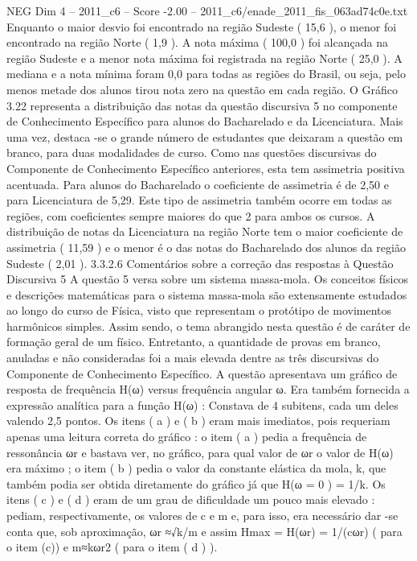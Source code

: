 \begin{textsample}{NEG Dim 4 – 2011\_c6 – Score -2.00 – 2011\_c6/enade\_2011\_fis\_063ad74c0e.txt}
Enquanto o maior desvio foi encontrado na região Sudeste ( 15,6 ), o menor foi encontrado na região Norte ( 1,9 ).
A nota máxima ( 100,0 ) foi alcançada na região Sudeste e a menor nota máxima foi registrada na região Norte ( 25,0 ).
A mediana e a nota mínima foram 0,0 para todas as regiões do Brasil, ou seja, pelo menos metade dos alunos tirou nota zero na questão em cada região.
O Gráfico 3.22 representa a distribuição das notas da questão discursiva 5 no componente de Conhecimento Específico para alunos do Bacharelado e da Licenciatura.
Mais uma vez, destaca -se o grande número de estudantes que deixaram a questão em branco, para duas modalidades de curso.
Como nas questões discursivas do Componente de Conhecimento Específico anteriores, esta tem assimetria positiva acentuada.
Para alunos do Bacharelado o coeficiente de assimetria é de 2,50 e para Licenciatura de 5,29.
Este tipo de assimetria também ocorre em todas as regiões, com coeficientes sempre maiores do que 2 para ambos os cursos.
A distribuição de notas da Licenciatura na região Norte tem o maior coeficiente de assimetria ( 11,59 ) e o menor é o das notas do Bacharelado dos alunos da região Sudeste ( 2,01 ). 3.3.2.6 Comentários sobre a correção das respostas à Questão Discursiva 5 A questão 5 versa sobre um sistema massa-mola.
Os conceitos físicos e descrições matemáticas para o sistema massa-mola são extensamente estudados ao longo do curso de Física, visto que representam o protótipo de movimentos harmônicos simples.
Assim sendo, o tema abrangido nesta questão é de caráter de formação geral de um físico.
Entretanto, a quantidade de provas em branco, anuladas e não consideradas foi a mais elevada dentre as três discursivas do Componente de Conhecimento Específico.
A questão apresentava um gráfico de resposta de frequência H(ω) versus frequência angular ω.
Era também fornecida a expressão analítica para a função H(ω) : Constava de 4 subitens, cada um deles valendo 2,5 pontos.
Os itens ( a ) e ( b ) eram mais imediatos, pois requeriam apenas uma leitura correta do gráfico : o item ( a ) pedia a frequência de ressonância ωr e bastava ver, no gráfico, para qual valor de ωr o valor de H(ω) era máximo ; o item ( b ) pedia o valor da constante elástica da mola, k, que também podia ser obtida diretamente do gráfico já que H(ω = 0 ) = 1/k.
Os itens ( c ) e ( d ) eram de um grau de dificuldade um pouco mais elevado : pediam, respectivamente, os valores de c e m e, para isso, era necessário dar -se conta que, sob aproximação, ωr ≈√k/m e assim Hmax = H(ωr) = 1/(cωr) ( para o item (c)) e m≈kωr2 ( para o item ( d ) ).

\end{textsample}
